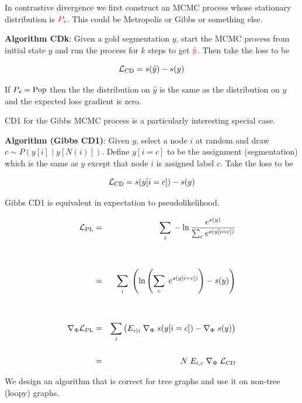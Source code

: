{

In contrastive divergence we first construct an MCMC process whose stationary distribution is ${\color{red} P_s}$.  This could be
Metropolis or Gibbs or something else.

\vfill
{\bf Algorithm CDk}: Given a gold segmentation $y$, start the MCMC process from initial state $y$ and run the process for $k$ steps
to get ${\color{red} \hat{y}}$.  Then take the loss to be

\vfill
{\color{red} $${\cal L}_{\mathrm{CD}}  = s(\hat{y}) - s(y)$$}

If $P_s = \mathrm{Pop}$ then the the distribution on $\hat{y}$ is the same as the distribution on $y$ and the
expected loss gradient is zero.


CD1 for the Gibbs MCMC process is a particularly interesting special case.

\vfill
{\bf Algorithm (Gibbs CD1)}: Given $y$, select a node $i$ at random and draw {\color{red} $c \sim P(y[i]\;| \;y[N(i)])$}. Define {\color{red} $y[i=c]$}
to be the assignment (segmentation) which is the same as $y$ except that node $i$ is assigned label $c$.  Take the loss to be

\vfill
{\color{red} $${\cal L}_{\mathrm{CD}}  = s(y[i=c]) - s(y)$$}


Gibbs CD1 is equivalent in expectation to pseudolikelihood.

{\huge
\begin{eqnarray*}
{\cal L}_{\mathrm{PL}} & = & \sum_i \; - \ln \frac{e^{s(y)}}{\sum_c e^{s(y[i=c])}} \\
\\
\\
& = & \sum_i\; \left(\ln \left(\sum_c \;e^{s(y[i=c])}\right) - s(y)\right) \\
\\
\\
\nabla_\Phi {\cal L}_{\mathrm{PL}} & = & \sum_i \left(E_{c|i}\; \nabla_\Phi\;s(y[i=c]) - \nabla_\Phi\; s(y)\right) \\
\\
& = & N \;E_{i,c}\; \nabla_\Phi \; {\cal L}_{\mathrm{CD}}
\end{eqnarray*}
}


We design an algorithm that is correct for tree graphs and use it on non-tree (loopy) graphs.

}

